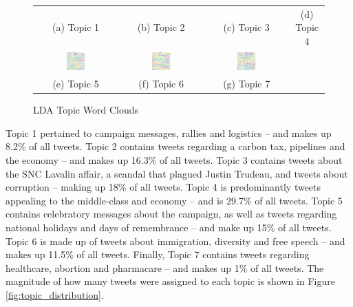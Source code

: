 \documentclass{nws}
\begin{document}
\begin{figure}[h!]
\begin{tabular}{cccc}
    (a) Topic 1 & (b) Topic 2 & (c) Topic 3 & (d) Topic 4 \\[6pt]
    \includegraphics[width=0.25\textwidth]{Figures/topic_5_wordcloud} &
    \includegraphics[width=0.25\textwidth]{Figures/topic_6_wordcloud} &
    \includegraphics[width=0.25\textwidth]{Figures/topic_7_wordcloud} \\
    (e) Topic 5 & (f) Topic 6 & (g) Topic 7 \\[6pt]
    \end{tabular}
    \caption[LDA Topic Word Clouds]{LDA Topic Word Clouds}
    \label{fig:topic_word_clouds}
\end{figure}

Topic 1 pertained to campaign messages, rallies and logistics – and makes up
8.2\% of all tweets. Topic 2 contains tweets regarding a carbon tax, pipelines
and the economy – and makes up 16.3\% of all tweets. Topic 3 contains tweets
about the SNC Lavalin affair, a scandal that plagued Justin Trudeau, and tweets
about corruption – making up 18\% of all tweets. Topic 4 is predominantly tweets
appealing to the middle-class and economy – and is 29.7\% of all tweets. Topic 5
contains celebratory messages about the campaign, as well as tweets regarding
national holidays and days of remembrance – and make up 15\% of all tweets.
Topic 6 is made up of tweets about immigration, diversity and free speech – and
makes up 11.5\% of all tweets. Finally, Topic 7 contains tweets regarding
healthcare, abortion and pharmacare – and makes up 1\% of all tweets. The
magnitude of how many tweets were assigned to each topic is shown in Figure
\ref{fig:topic_distribution}.
\end{document}
